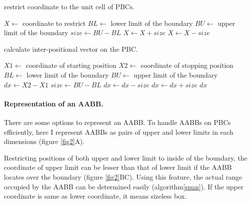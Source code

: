 \documentclass[10pt,letterpaper,twocolumn]{article}
\begin{document}
\begin{algorithm}
    \caption{restrict coordinate to the unit cell of PBCs.}
    \label{restrict_position}
    \begin{algorithmic}
        \State $X  \gets$ coordinate to restrict
        \State $BL \gets$ lower limit of the boundary
        \State $BU \gets$ upper limit of the boundary
            \State $size \gets BU - BL$
                \State $X \gets X + size$
                \State $X \gets X - size$
            \EndIf
        \EndFunction
     \end{algorithmic}
\end{algorithm}

\begin{algorithm}
    \caption{calculate inter-positional vector on the PBC.}
    \label{calc_direction}
    \begin{algorithmic}
        \State $X1 \gets$ coordinate of starting position
        \State $X2 \gets$ coordinate of stopping position
        \State $BL \gets$ lower limit of the boundary
        \State $BU \gets$ upper limit of the boundary
            \State $dx \gets X2 - X1$
            \State $size \gets BU - BL$
                \State $dx \gets dx - size$
                \State $dx \gets dx + size$
            \EndIf
            \State \Return $dx$
        \EndFunction
     \end{algorithmic}
\end{algorithm}

\paragraph{Representation of an AABB.}
There are some options to represent an AABB. To handle AABBs on PBCs efficiently,
here I represent AABBs as pairs of upper and lower limits in each dimensions
(figure \ref{fig2}A).

Restricting positions of both upper and lower limit to inside of the boundary,
the coordinate of upper limit can be lesser than that of lower limit if the AABB
locates over the boundary (figure \ref{fig2}BC). Using this feature, the actual
range occupied by the AABB can be determined easily (algorithm\ref{span}).
If the upper coordinate is same as lower coordinate, it means sizeless box.
\end{document}
